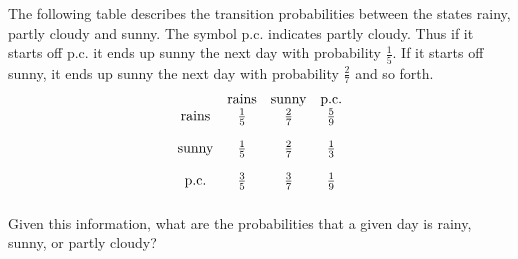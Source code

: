 \begin{ex} The following table describes the transition probabilities between the
states rainy, partly cloudy and sunny. The symbol p.c. indicates partly
cloudy. Thus if it starts off p.c. it ends up sunny the next day with
probability $\frac{1}{5}$. If it starts off sunny, it ends up sunny the next
day with probability $\frac{2}{7}$ and so forth.
\begin{equation*}
\begin{array}{cccc}
& \text{rains} & \text{sunny} & \text{p.c.} \\
\text{rains} & \vspace{0.05in}\frac{1}{5} & \vspace{0.05in}\frac{2}{7} & \vspace{0.05in}\frac{5}{9} \\
\text{sunny} & \vspace{0.05in}\frac{1}{5} & \vspace{0.05in}\frac{2}{7} & \vspace{0.05in}\frac{1}{3} \\
\text{p.c.} & \vspace{0.05in}\frac{3}{5} & \vspace{0.05in}\frac{3}{7} & \vspace{0.05in}\frac{1}{9}
\end{array}
\end{equation*}
Given this information, what are the probabilities that a given day is
rainy, sunny, or partly cloudy?
\end{ex}

